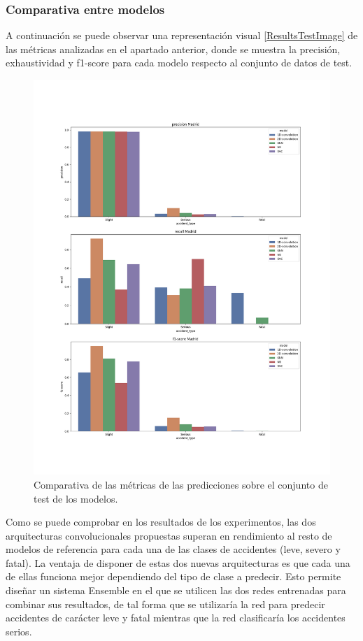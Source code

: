   \subsubsection{Comparativa entre modelos}

    A continuación se puede observar una representación visual \eqref{ResultsTestImage} de las métricas analizadas en el apartado anterior, donde se muestra la precisión, exhaustividad y f1-score para cada modelo respecto al conjunto de datos de test.

    \begin{figure}[H]
        \centering
        \includegraphics[width=13cm]{archivos/5.Resultados/ComparativaTest}
        \caption{Comparativa de las métricas de las predicciones sobre el conjunto de test de los modelos.}
        \label{ResultsTestImage}
     \end{figure}

     Como se puede comprobar en los resultados de los experimentos, las dos arquitecturas convolucionales propuestas superan en rendimiento al resto de modelos de referencia para cada una de las clases de accidentes (leve, severo y fatal). La ventaja de disponer de estas dos nuevas arquitecturas es que cada una de ellas funciona mejor dependiendo del tipo de clase a predecir. Esto permite diseñar un sistema Ensemble en el que se utilicen las dos redes entrenadas para combinar sus resultados, de tal forma que se utilizaría la red  para predecir accidentes de carácter leve y fatal mientras que la red  clasificaría los accidentes serios.